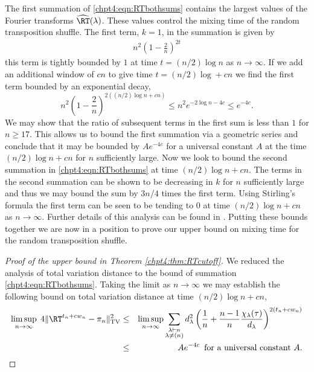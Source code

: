 \documentclass[11pt]{report}
\begin{document}
The first summation of \eqref{chpt4:eqn:RTbothsums} contains the largest values of the Fourier transforms $\widehat{\RT}(\lambda)$. These values control the mixing time of the random transposition shuffle. The first term, $k=1$, in the summation is given by
\begin{eqnarray}
n^{2}\left(1 - \frac{2}{n}\right)^{2t} \label{chpt4:eqn:rtsecondbiggesteig}
\end{eqnarray}
this term is tightly bounded by $1$ at time $t =(n/2)\log n$ as $n\to\infty$. If we add an additional window of $cn$ to give time $t =(n/2)\log + cn$ we find the first term bounded by an exponential decay,
\[n^{2}\left(1 - \frac{2}{n}\right)^{2\left((n/2)\log n +cn\right)} \leq n^{2} e^{-2\log n - 4c} \leq e^{-4c}.\]
We may show that the ratio of subsequent terms in the first sum is less than $1$ for $n\geq 17$. This allows us to bound the first summation via a geometric series and conclude that it may be bounded by $Ae^{-4c}$ for a universal constant $A$ at the time $(n/2)\log n + c n$ for $n$ sufficiently large. 
Now we look to bound the second summation in \eqref{chpt4:eqn:RTbothsums} at time $(n/2)\log n +cn$.
The terms in the second summation can be shown to be decreasing in $k$ for $n$ sufficiently large and thus we may bound the sum by $3n/4$ times the first term. Using Stirling's formula the first term can be seen to be tending to $0$ at time $(n/2)\log n + cn$ as $n\to\infty$. Further details of this analysis can be found in \cite{Diaconis1988}. Putting these bounds together we are now in a position to prove our upper bound on mixing time for the random transposition shuffle.


\begin{proof}[Proof of the upper bound in Theorem \ref{chpt4:thm:RTcutoff}]
	We reduced the analysis of total variation distance to the bound of summation \eqref{chpt4:eqn:RTbothsums}. Taking the limit as $n\to\infty$ we may establish the following bound on total variation distance at time $(n/2)\log n +cn$,
	\begin{eqnarray*}
		\limsup_{n\to \infty} \; 4\lVert \RT^{t_{n} + cw_{n}} -\pi_{n} 
		\rVert_{\tiny \textnormal{TV}}^{2} & \leq  &\limsup_{n\to \infty}
		\sum_{\substack{\lambda \vdash n\\\lambda \neq (n)}} 
		d_{\lambda}^{2}\left(\frac{1}{n} + 
		\frac{n-1}{n}\frac{\chi_{\lambda}(\tau)}{d_{\lambda}} \right)^{2(t_{n} + cw_{n})} \\ 
		&\leq & A e^{-4c} \, \textnormal{ for a universal constant } A. \qedhere 
	\end{eqnarray*}
\end{proof}
\end{document}
